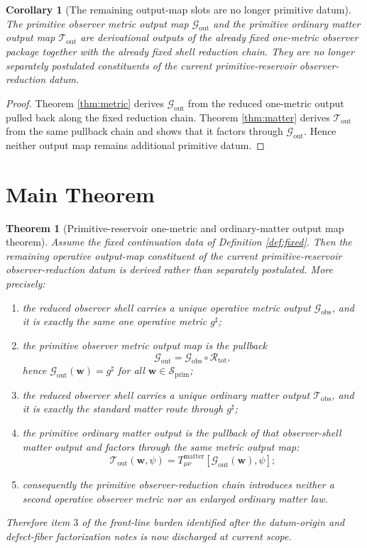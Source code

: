 \documentclass[11pt]{article}
\newcommand{\CompletedMetric}{g^{\sharp}}
\newcommand{\ReductionTriple}{\mathcal R_{\mathrm{tot}}}
\newcommand{\PrimShell}{\mathcal S_{\mathrm{prim}}}
\newcommand{\MetricOut}{\mathscr G_{\mathrm{out}}}
\newcommand{\MatterOut}{\mathscr T_{\mathrm{out}}}
\newcommand{\ObsMetricOut}{\mathscr G_{\mathrm{obs}}}
\newcommand{\ObsMatterOut}{\mathscr T_{\mathrm{obs}}}
\newtheorem{corollary}{Corollary}
\newtheorem{theorem}{Theorem}
\begin{document}
\begin{corollary}[The remaining output-map slots are no longer primitive datum]
\label{cor:derived}
The primitive observer metric output map \(\MetricOut\) and the primitive ordinary matter output map \(\MatterOut\) are derivational outputs of the already fixed one-metric observer package together with the already fixed shell reduction chain. They are no longer separately postulated constituents of the current primitive-reservoir observer-reduction datum.
\end{corollary}

\begin{proof}
Theorem \ref{thm:metric} derives \(\MetricOut\) from the reduced one-metric output pulled back along the fixed reduction chain. Theorem \ref{thm:matter} derives \(\MatterOut\) from the same pullback chain and shows that it factors through \(\MetricOut\). Hence neither output map remains additional primitive datum.
\end{proof}

\section{Main Theorem}

\begin{theorem}[Primitive-reservoir one-metric and ordinary-matter output map theorem]
\label{thm:main}
Assume the fixed continuation data of Definition \ref{def:fixed}. Then the remaining operative output-map constituent of the current primitive-reservoir observer-reduction datum is derived rather than separately postulated. More precisely:
\begin{enumerate}
    \item the reduced observer shell carries a unique operative metric output \(\ObsMetricOut\), and it is exactly the same one operative metric \(\CompletedMetric\);
    \item the primitive observer metric output map is the pullback
    \[
    \MetricOut
    =
    \ObsMetricOut\circ\ReductionTriple,
    \]
    hence \(\MetricOut(\mathbf w)=\CompletedMetric\) for all \(\mathbf w\in\PrimShell\);
    \item the reduced observer shell carries a unique ordinary matter output \(\ObsMatterOut\), and it is exactly the standard matter route through \(\CompletedMetric\);
    \item the primitive ordinary matter output is the pullback of that observer-shell matter output and factors through the same metric output map:
    \[
    \MatterOut(\mathbf w,\psi)
    =
    T_{\mu\nu}^{\mathrm{matter}}[\MetricOut(\mathbf w),\psi];
    \]
    \item consequently the primitive observer-reduction chain introduces neither a second operative observer metric nor an enlarged ordinary matter law.
\end{enumerate}
Therefore item \(3\) of the front-line burden identified after the datum-origin and defect-fiber factorization notes is now discharged at current scope.
\end{theorem}
\end{document}
